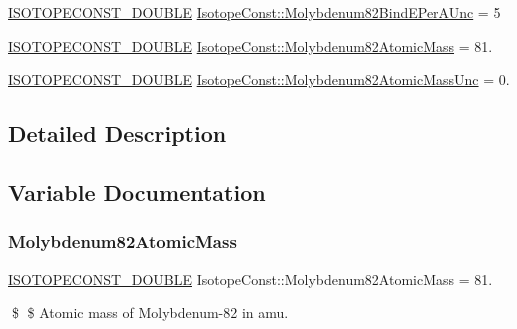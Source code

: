 \begin{DoxyCompactItemize}
\mbox{\hyperlink{group___isotope_const-_macros_ga8f45a7272ce02c0b4c65c44636ed719a}{I\+S\+O\+T\+O\+P\+E\+C\+O\+N\+S\+T\+\_\+\+D\+O\+U\+B\+LE}} \mbox{\hyperlink{group___isotope_const-_molybdenum-_mo82_gaf8b37f994745b397970ff658874e8ad9}{Isotope\+Const\+::\+Molybdenum82\+Bind\+E\+Per\+A\+Unc}} = 5
\item 
\mbox{\hyperlink{group___isotope_const-_macros_ga8f45a7272ce02c0b4c65c44636ed719a}{I\+S\+O\+T\+O\+P\+E\+C\+O\+N\+S\+T\+\_\+\+D\+O\+U\+B\+LE}} \mbox{\hyperlink{group___isotope_const-_molybdenum-_mo82_ga8b6e70b4c38fdc16c989eb0d3328afb5}{Isotope\+Const\+::\+Molybdenum82\+Atomic\+Mass}} = 81.
\item 
\mbox{\hyperlink{group___isotope_const-_macros_ga8f45a7272ce02c0b4c65c44636ed719a}{I\+S\+O\+T\+O\+P\+E\+C\+O\+N\+S\+T\+\_\+\+D\+O\+U\+B\+LE}} \mbox{\hyperlink{group___isotope_const-_molybdenum-_mo82_gad5f45bf4abfba8b2e6874f15007e57bc}{Isotope\+Const\+::\+Molybdenum82\+Atomic\+Mass\+Unc}} = 0.
\end{DoxyCompactItemize}


\subsection{Detailed Description}


\subsection{Variable Documentation}
\mbox{\label{group___isotope_const-_molybdenum-_mo82_ga8b6e70b4c38fdc16c989eb0d3328afb5}} 
\subsubsection{\texorpdfstring{Molybdenum82\+Atomic\+Mass}{Molybdenum82AtomicMass}}
{\footnotesize\ttfamily \mbox{\hyperlink{group___isotope_const-_macros_ga8f45a7272ce02c0b4c65c44636ed719a}{I\+S\+O\+T\+O\+P\+E\+C\+O\+N\+S\+T\+\_\+\+D\+O\+U\+B\+LE}} Isotope\+Const\+::\+Molybdenum82\+Atomic\+Mass = 81.}

\$ \$ Atomic mass of Molybdenum-\/82 in amu. \mbox{\label{group___isotope_const-_molybdenum-_mo82_gad5f45bf4abfba8b2e6874f15007e57bc}} 

